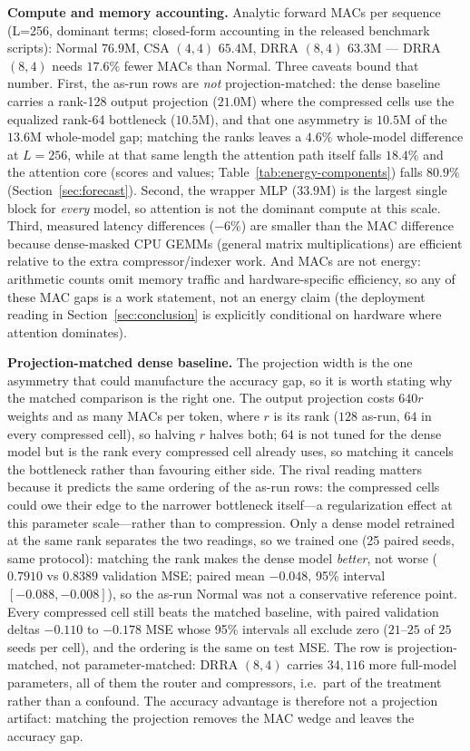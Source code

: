 \textbf{Compute and memory accounting.} Analytic forward MACs per sequence
(L=256, dominant terms; closed-form accounting in the released benchmark
scripts): Normal $76.9$M, CSA $(4,4)$ $65.4$M, DRRA $(8,4)$ $63.3$M --- DRRA
$(8,4)$ needs $17.6\%$ fewer MACs than Normal. Three caveats bound that number.
First, the as-run rows are \emph{not} projection-matched: the dense baseline
carries a rank-128 output projection ($21.0$M) where the compressed cells use
the equalized rank-64 bottleneck ($10.5$M), and that one asymmetry is $10.5$M of
the $13.6$M whole-model gap; matching the ranks leaves a $4.6\%$ whole-model
difference at $L{=}256$, while at that same length the attention path itself
falls $18.4\%$ and the attention core (scores and values;
Table~\ref{tab:energy-components}) falls $80.9\%$ (Section~\ref{sec:forecast}). Second, the wrapper MLP ($33.9$M)
is the largest single block for \emph{every} model, so attention is not the
dominant compute at this scale. Third, measured latency differences ($-6\%$) are
smaller than the MAC difference because dense-masked CPU GEMMs (general
matrix multiplications) are efficient
relative to the extra compressor/indexer work. And MACs are not energy:
arithmetic counts omit memory traffic and hardware-specific efficiency, so any of
these MAC gaps is a work statement, not an energy claim (the deployment reading
in Section~\ref{sec:conclusion} is explicitly conditional on hardware where
attention dominates).

\textbf{Projection-matched dense baseline.} The projection width is the one
asymmetry that could manufacture the accuracy gap, so it is worth stating why
the matched comparison is the right one. The output projection costs $640r$
weights and as many MACs per token, where $r$ is its rank ($128$ as-run,
$64$ in every compressed cell), so halving $r$ halves both; $64$ is not tuned for the
dense model but is the rank every compressed cell already uses, so matching it
cancels the bottleneck rather than favouring either side. The rival reading
matters because it predicts the same ordering of the as-run rows: the compressed
cells could owe their edge to the narrower bottleneck itself---a regularization
effect at this parameter scale---rather than to compression. Only a dense model
retrained at the same rank separates the two readings, so we trained one (25
paired seeds, same protocol): matching the rank makes the dense model
\emph{better}, not worse ($0.7910$ vs $0.8389$ validation MSE; paired mean
$-0.048$, 95\% interval $[-0.088,-0.008]$), so the as-run Normal was not a
conservative reference point. Every compressed cell still beats the matched
baseline, with paired validation deltas $-0.110$ to $-0.178$ MSE whose 95\%
intervals all exclude zero ($21$--$25$ of $25$ seeds per cell), and the ordering
is the same on test MSE. The row is projection-matched, not parameter-matched:
DRRA $(8,4)$ carries $34{,}116$ more full-model parameters, all of them the
router and compressors, i.e.\ part of the treatment rather than a confound. The
accuracy advantage is therefore not a projection artifact: matching the
projection removes the MAC wedge and leaves the accuracy gap.

